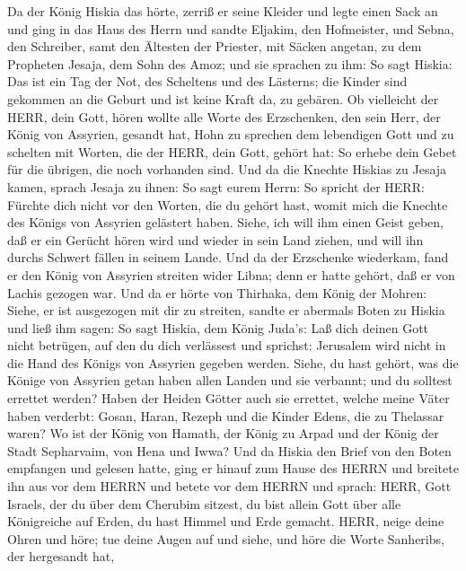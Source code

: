  Da der König Hiskia das hörte, zerriß er seine Kleider und
legte einen Sack an und ging in das Haus des Herrn  und
sandte Eljakim, den Hofmeister, und Sebna, den Schreiber, samt den
Ältesten der Priester, mit Säcken angetan, zu dem Propheten Jesaja, dem
Sohn des Amoz;  und sie sprachen zu ihm: So sagt Hiskia: Das
ist ein Tag der Not, des Scheltens und des Lästerns; die Kinder sind
gekommen an die Geburt und ist keine Kraft da, zu gebären. 
Ob vielleicht der HERR, dein Gott, hören wollte alle Worte des
Erzschenken, den sein Herr, der König von Assyrien, gesandt hat, Hohn zu
sprechen dem lebendigen Gott und zu schelten mit Worten, die der HERR,
dein Gott, gehört hat: So erhebe dein Gebet für die übrigen, die noch
vorhanden sind.  Und da die Knechte Hiskias zu Jesaja kamen,
 sprach Jesaja zu ihnen: So sagt eurem Herrn: So spricht der
HERR: Fürchte dich nicht vor den Worten, die du gehört hast, womit mich
die Knechte des Königs von Assyrien gelästert haben.  Siehe,
ich will ihm einen Geist geben, daß er ein Gerücht hören wird und wieder
in sein Land ziehen, und will ihn durchs Schwert fällen in seinem Lande.
 Und da der Erzschenke wiederkam, fand er den König von
Assyrien streiten wider Libna; denn er hatte gehört, daß er von Lachis
gezogen war.  Und da er hörte von Thirhaka, dem König der
Mohren: Siehe, er ist ausgezogen mit dir zu streiten, sandte er abermals
Boten zu Hiskia und ließ ihm sagen:  So sagt Hiskia, dem
König Juda's: Laß dich deinen Gott nicht betrügen, auf den du dich
verlässest und sprichst: Jerusalem wird nicht in die Hand des Königs von
Assyrien gegeben werden.  Siehe, du hast gehört, was die
Könige von Assyrien getan haben allen Landen und sie verbannt; und du
solltest errettet werden?  Haben der Heiden Götter auch sie
errettet, welche meine Väter haben verderbt: Gosan, Haran, Rezeph und
die Kinder Edens, die zu Thelassar waren?  Wo ist der König
von Hamath, der König zu Arpad und der König der Stadt Sepharvaim, von
Hena und Iwwa?  Und da Hiskia den Brief von den Boten
empfangen und gelesen hatte, ging er hinauf zum Hause des HERRN und
breitete ihn aus vor dem HERRN  und betete vor dem HERRN
und sprach: HERR, Gott Israels, der du über dem Cherubim sitzest, du
bist allein Gott über alle Königreiche auf Erden, du hast Himmel und
Erde gemacht.  HERR, neige deine Ohren und höre; tue deine
Augen auf und siehe, und höre die Worte Sanheribs, der hergesandt hat,
